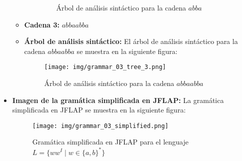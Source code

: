 \documentclass[11pt]{report}
\begin{document}
\begin{itemize}
\begin{itemize}
\begin{itemize}
\begin{figure}[H]
        \caption{Árbol de análisis sintáctico para la cadena $abba$}
        \label{fig:arbol8}
      \end{figure}
    \end{itemize}
    \item \textbf{Cadena 3:} $abbaabba$
    \item \textbf{Árbol de análisis sintáctico:} El árbol de análisis sintáctico para la cadena $abbaabba$ se muestra en la siguiente figura:
    \begin{figure}[H]
      \centering
      \texttt{[image: img/grammar\_03\_tree\_3.png]}
      \caption{Árbol de análisis sintáctico para la cadena $abbaabba$}
      \label{fig:arbol9}
    \end{figure}
  \end{itemize}
  \item \textbf{Imagen de la gramática simplificada en JFLAP:} La gramática simplificada en JFLAP se muestra en la siguiente figura:
  \begin{figure}[H]
    \centering
    \texttt{[image: img/grammar\_03\_simplified.png]}
    \caption{Gramática simplificada en JFLAP para el lenguaje $L = \{ww^I \mid w \in \{a, b\}^*\}$}
    \label{fig:gramatica3_simplified}
  \end{figure}
\end{itemize}

\newpage

\end{document}
